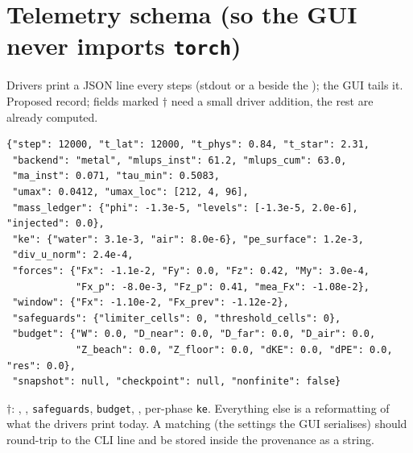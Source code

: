 \documentclass[11pt,a4paper]{article}
\newcommand{\code}[1]{\texttt{#1}}
\begin{document}
\section{Telemetry schema (so the GUI never imports \texorpdfstring{\code{torch}}{torch})}\label{sec:telemetry}
Drivers print a JSON line every  steps (stdout or a
 beside the ); the GUI tails it. Proposed record; fields
marked $\dagger$ need a small driver addition, the rest are already computed.
\begin{lstlisting}
{"step": 12000, "t_lat": 12000, "t_phys": 0.84, "t_star": 2.31,
 "backend": "metal", "mlups_inst": 61.2, "mlups_cum": 63.0,
 "ma_inst": 0.071, "tau_min": 0.5083,
 "umax": 0.0412, "umax_loc": [212, 4, 96],
 "mass_ledger": {"phi": -1.3e-5, "levels": [-1.3e-5, 2.0e-6], "injected": 0.0},
 "ke": {"water": 3.1e-3, "air": 8.0e-6}, "pe_surface": 1.2e-3,
 "div_u_norm": 2.4e-4,
 "forces": {"Fx": -1.1e-2, "Fy": 0.0, "Fz": 0.42, "My": 3.0e-4,
            "Fx_p": -8.0e-3, "Fz_p": 0.41, "mea_Fx": -1.08e-2},
 "window": {"Fx": -1.10e-2, "Fx_prev": -1.12e-2},
 "safeguards": {"limiter_cells": 0, "threshold_cells": 0},
 "budget": {"W": 0.0, "D_near": 0.0, "D_far": 0.0, "D_air": 0.0,
            "Z_beach": 0.0, "Z_floor": 0.0, "dKE": 0.0, "dPE": 0.0, "res": 0.0},
 "snapshot": null, "checkpoint": null, "nonfinite": false}
\end{lstlisting}
$\dagger$: , , \code{safeguards},
\code{budget}, , per-phase \code{ke}. Everything else is a
reformatting of what the drivers print today. A matching 
(the settings the GUI serialises) should round-trip to the CLI line and be stored
inside the provenance  as a string.

\end{document}
